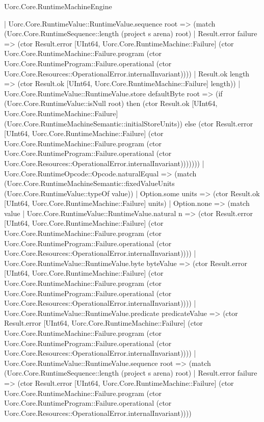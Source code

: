 \begin{lexlean}{Uorc.Core.RuntimeMachineEngine}
\begin{semanticmodule}
{              | Uorc.Core.RuntimeValue::RuntimeValue.sequence root => (match (Uorc.Core.RuntimeSequence::length (project s arena) root)
                | Result.error failure => (ctor Result.error [UInt64, Uorc.Core.RuntimeMachine::Failure] (ctor Uorc.Core.RuntimeMachine::Failure.program (ctor Uorc.Core.RuntimeProgram::Failure.operational (ctor Uorc.Core.Resources::OperationalError.internalInvariant))))
                | Result.ok length => (ctor Result.ok [UInt64, Uorc.Core.RuntimeMachine::Failure] length))
              | Uorc.Core.RuntimeValue::RuntimeValue.store defaultByte root => (if (Uorc.Core.RuntimeValue::isNull root) then (ctor Result.ok [UInt64, Uorc.Core.RuntimeMachine::Failure] (Uorc.Core.RuntimeMachineSemantic::initialStoreUnits)) else (ctor Result.error [UInt64, Uorc.Core.RuntimeMachine::Failure] (ctor Uorc.Core.RuntimeMachine::Failure.program (ctor Uorc.Core.RuntimeProgram::Failure.operational (ctor Uorc.Core.Resources::OperationalError.internalInvariant)))))))
          | Uorc.Core.RuntimeOpcode::Opcode.naturalEqual => (match (Uorc.Core.RuntimeMachineSemantic::fixedValueUnits (Uorc.Core.RuntimeValue::typeOf value))
            | Option.some units => (ctor Result.ok [UInt64, Uorc.Core.RuntimeMachine::Failure] units)
            | Option.none => (match value
              | Uorc.Core.RuntimeValue::RuntimeValue.natural n => (ctor Result.error [UInt64, Uorc.Core.RuntimeMachine::Failure] (ctor Uorc.Core.RuntimeMachine::Failure.program (ctor Uorc.Core.RuntimeProgram::Failure.operational (ctor Uorc.Core.Resources::OperationalError.internalInvariant))))
              | Uorc.Core.RuntimeValue::RuntimeValue.byte byteValue => (ctor Result.error [UInt64, Uorc.Core.RuntimeMachine::Failure] (ctor Uorc.Core.RuntimeMachine::Failure.program (ctor Uorc.Core.RuntimeProgram::Failure.operational (ctor Uorc.Core.Resources::OperationalError.internalInvariant))))
              | Uorc.Core.RuntimeValue::RuntimeValue.predicate predicateValue => (ctor Result.error [UInt64, Uorc.Core.RuntimeMachine::Failure] (ctor Uorc.Core.RuntimeMachine::Failure.program (ctor Uorc.Core.RuntimeProgram::Failure.operational (ctor Uorc.Core.Resources::OperationalError.internalInvariant))))
              | Uorc.Core.RuntimeValue::RuntimeValue.sequence root => (match (Uorc.Core.RuntimeSequence::length (project s arena) root)
                | Result.error failure => (ctor Result.error [UInt64, Uorc.Core.RuntimeMachine::Failure] (ctor Uorc.Core.RuntimeMachine::Failure.program (ctor Uorc.Core.RuntimeProgram::Failure.operational (ctor Uorc.Core.Resources::OperationalError.internalInvariant))))
}
\end{semanticmodule}
\end{lexlean}
